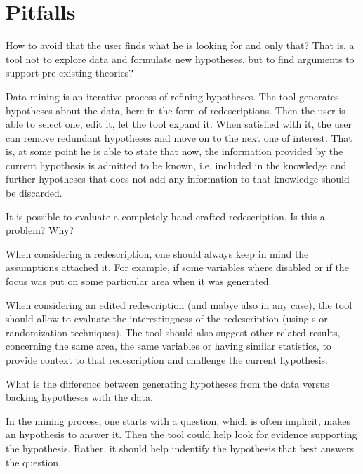 \section{Pitfalls}
How to avoid that the user finds what he is looking for and only that?
That is, a tool not to explore data and formulate new hypotheses, but to find arguments to support pre-existing theories?

Data mining is an iterative process of refining hypotheses. The tool generates hypotheses about the data, here in the form of redescriptions. Then the user is able to select one, edit it, let the tool expand it. When satisfied with it, the user can remove redundant hypotheses and move on to the next one of interest. That is, at some point he is able to state that now, the information provided by the current hypothesis is admitted to be known, i.e. included in the knowledge and further hypotheses that does not add any information to that knowledge should be discarded.

It is possible to evaluate a completely hand-crafted redescription. Is this a problem? Why?

When considering a redescription, one should always keep in mind the assumptions attached it. For example, if some variables where disabled or if the focus was put on some particular area when it was generated.

When considering an edited redescription (and mabye also in any case), the tool should allow to evaluate the interestingness of the redescription (using \pValue{}s or randomization techniques). The tool should also suggest other related results, concerning the same area, the same variables or having similar statistics, to provide context to that redescription and challenge the current hypothesis.

What is the difference between generating hypotheses from the data versus backing hypotheses with the data.

In the mining process, one starts with a question, which is often implicit, makes an hypothesis to answer it. Then the tool could help look for evidence supporting the hypothesis. Rather, it should help indentify the hypothesis that best answers the question.  



